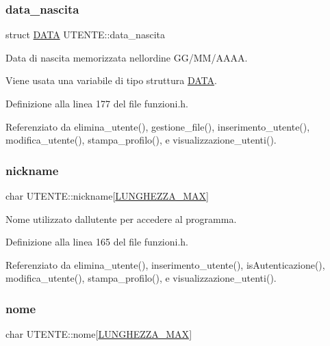 \subsubsection{\texorpdfstring{data\+\_\+nascita}{data\_nascita}}
{\footnotesize\ttfamily struct \hyperlink{struct_d_a_t_a}{D\+A\+TA} U\+T\+E\+N\+T\+E\+::data\+\_\+nascita}



Data di nascita memorizzata nell\textquotesingle{}ordine G\+G/\+M\+M/\+A\+A\+AA. 

Viene usata una variabile di tipo struttura \hyperlink{struct_d_a_t_a}{D\+A\+TA}. 

Definizione alla linea 177 del file funzioni.\+h.



Referenziato da elimina\+\_\+utente(), gestione\+\_\+file(), inserimento\+\_\+utente(), modifica\+\_\+utente(), stampa\+\_\+profilo(), e visualizzazione\+\_\+utenti().

\mbox{\label{struct_u_t_e_n_t_e_a0ae0027764658fd60ce899a829b7b2fe}} 
\subsubsection{\texorpdfstring{nickname}{nickname}}
{\footnotesize\ttfamily char U\+T\+E\+N\+T\+E\+::nickname\mbox{[}\hyperlink{funzioni_8h_a2cdd71b92d6e869f8b094e32a6da6a62}{L\+U\+N\+G\+H\+E\+Z\+Z\+A\+\_\+\+M\+AX}\mbox{]}}

Nome utilizzato dall\textquotesingle{}utente per accedere al programma. 

Definizione alla linea 165 del file funzioni.\+h.



Referenziato da elimina\+\_\+utente(), inserimento\+\_\+utente(), is\+Autenticazione(), modifica\+\_\+utente(), stampa\+\_\+profilo(), e visualizzazione\+\_\+utenti().

\mbox{\label{struct_u_t_e_n_t_e_acd2869ae6d739de9978a588124906ae8}} 
\subsubsection{\texorpdfstring{nome}{nome}}
{\footnotesize\ttfamily char U\+T\+E\+N\+T\+E\+::nome\mbox{[}\hyperlink{funzioni_8h_a2cdd71b92d6e869f8b094e32a6da6a62}{L\+U\+N\+G\+H\+E\+Z\+Z\+A\+\_\+\+M\+AX}\mbox{]}}

